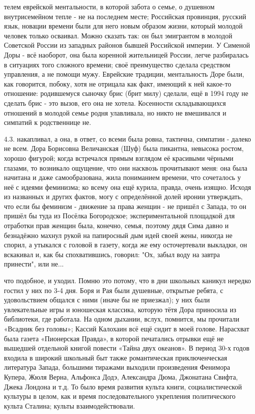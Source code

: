 телем еврейской ментальности, в которой забота о семье, о душевном внутрисемейном тепле - не на последнем месте; Российская провинция, русский язык, новации времени были для него новым образом жизни, который молодой человек только осваивал. Можно сказать так: он был эмигрантом в молодой Советской России из западных районов бывшей Российской империи. У Сименой Доры - всё наоборот, она была коренной жительницей России, легче разбиралась в ситуациях того сложного времени; своё преимущество сделала средством управления, а не помощи мужу. Еврейские традиции, ментальность Доре были, как говорится, побоку, хотя не отрицала как факт, имеющий к ней какое-то отношение: родившемуся сыночку брис (брит милу) сделали, ещё в 1994 году не сделать брис - это вызов, его она не хотела. Косенности складывающихся отношений в молодой семье родня улавливала, но никто не вмешивался и симпатий к родственнице не.

4.3. накапливал, а она, в ответ, со всеми была ровна, тактична, симпатии - далеко не всем. Дора Борисовна Величанская (Шуф) была пикантна, невысока ростом, хорошо фигурой; когда встречался прямым взглядом её красивыми чёрными глазами, то возникало ощущение, что они насквозь прочитывают меня: она была начитана и даже самообразована, жила пониманием времени, что сочеталось у неё с идеями феминизма; ко всему она ещё курила, правда, очень изящно. Исходя из названных и других фактов, могу с определённой долей иронии утверждать, что если бы феминизм - движение за права женщин - не пришёл с Запада, то он пришёл бы туда из Посёлка Богородское; экспериментальной площадкой для отработки прав женщин была, конечно, семья, поэтому дядя Сима давно и безнадёжно махнул рукой на папиросный дым идей своей жены, никогда не спорил, а утыкался с головой в газету, когда же ему осточертевали выкладки, он вскакивал и, как бы спохватившись, говорил: "Ох, забыл воду на завтра принести", или не...

что подобное, и уходил. Помню это потому, что в дни школьных каникул нередко гостил у них по 3-4 дня. Боря и Рая были душевные, открытые ребята, с удовольствием общался с ними (иначе бы не приезжал); у них были увлекательные игры и юношеская классика, которую тётя Дора приносила из библиотеки, где работала. На одном дыхании, вслух, помнится, мы прочитали «Всадник без головы»; Кассий Калохаин всё ещё сидит в моей голове. Нарасхват была газета «Пионерская Правда», в которой печатались отрывки ещё не вышедшей отдельной книгой повести «Тайна двух океанов». В период 30-х годов входила в широкий школьный быт также романтическая приключенческая литература Запада, большими тиражами выходили произведения Фенимора Купера, Жюля Верна, Альфонса Додэ, Александра Дюма, Джонатана Свифта, Джека Лондона и т.д. То было время развития культа книги, социалистической культуры в целом, как и время последовательного укрепления политического культа Сталина; культы взаимодействовали.

